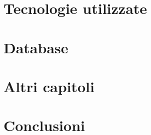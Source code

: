 
\chapter{Tecnologie utilizzate}
\lipsum
\chapter{Database}

\chapter{Altri capitoli}
\chapter{Conclusioni}

